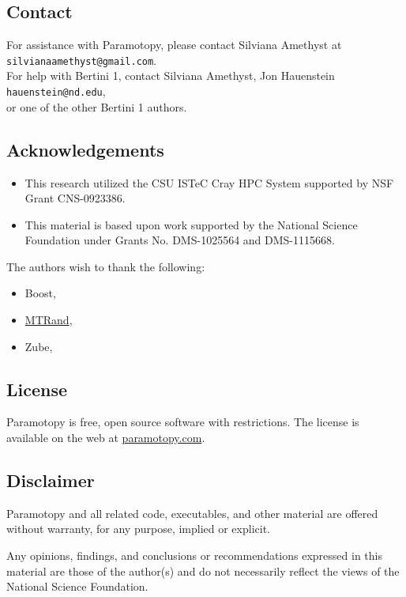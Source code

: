 \clearpage

\subsection{Contact}
\label{sec:contact}
For assistance with Paramotopy, please contact Silviana Amethyst at \\
\texttt{silvianaamethyst@gmail.com}.  \\For help with Bertini 1, contact Silviana Amethyst, Jon Hauenstein\\
\texttt{hauenstein@nd.edu}, \\or one of the other Bertini 1 authors.

\subsection*{Acknowledgements}
\begin{itemize}
\item  This research utilized the CSU ISTeC Cray HPC System supported by NSF Grant CNS-0923386.
\item  This material is based upon work supported by the National Science Foundation under Grants No. DMS-1025564 and DMS-1115668.
\end{itemize}

The authors wish to thank the following:
\begin{itemize}
	\item Boost,
	\item \href{http://www.bedaux.net/mtrand/}{MTRand},
	\item Zube,
\end{itemize}

\clearpage
\subsection{License}
\label{sec:license}
Paramotopy is free, open source software with restrictions.  The license is available on the web at \href{https://paramotopy.com/resources/programs/paramotopy_license.txt}{paramotopy.com}.

\subsection*{Disclaimer}
Paramotopy and all related code, executables, and other material are offered without warranty, for any purpose, implied or explicit. 

Any opinions, findings, and conclusions or recommendations expressed in this material are those of the author(s) and do not necessarily reflect the views of the National Science Foundation.




